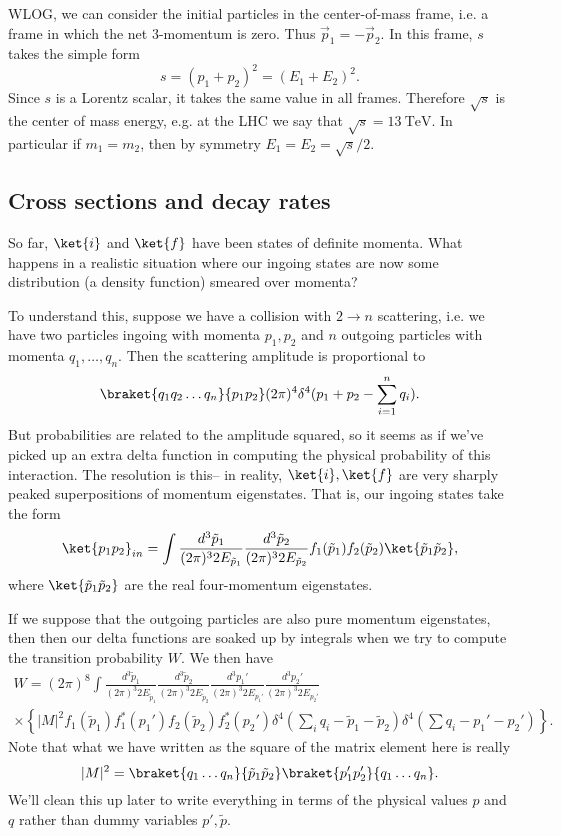 WLOG, we can consider the initial particles in the center-of-mass frame, i.e. a frame in which the net $3$-momentum is zero. Thus $\vec{p}_1=-\vec{p}_2.$
In this frame, $s$ takes the simple form
$$s=(p_1+p_2)^2=(E_1+E_2)^2.$$ Since $s$ is a Lorentz scalar, it takes the same value in all frames. Therefore $\sqrt{s}$ is the center of mass energy, e.g. at the LHC we say that $\sqrt{s}=\SI{13}{\tera\electronvolt}$. In particular if $m_1=m_2$, then by symmetry $E_1=E_2=\sqrt{s}/2.$

\subsection*{Cross sections and decay rates} So far, $\ket{i}$ and $\ket{f}$ have been states of definite momenta. What happens in a realistic situation where our ingoing states are now some distribution (a density function) smeared over momenta?

To understand this, suppose we have a collision with $2\to n$ scattering, i.e. we have two particles ingoing with momenta $p_1,p_2$ and $n$ outgoing particles with momenta $q_1,\ldots,q_n$. Then the scattering amplitude is proportional to
$$\braket{q_1 q_2\ldots q_n}{p_1p_2}(2\pi)^4 \delta^4(p_1+p_2 -\sum_{i=1}^n q_i).$$
But probabilities are related to the amplitude squared, so it seems as if we've picked up an extra delta function in computing the physical probability of this interaction. The resolution is this-- in reality, $\ket{i},\ket{f}$ are very sharply peaked superpositions of momentum eigenstates. That is, our ingoing states take the form
$$\ket{p_1p_2}_{in}=\int \frac{d^3 \tilde p_1}{(2\pi)^3 2E_{\tilde p_1}}\frac{d^3 \tilde p_2}{(2\pi)^3 2E_{\tilde p_2}} f_1(\tilde p_1)f_2 (\tilde p_2)\ket{\tilde p_1 \tilde p_2},$$
where $\ket{\tilde p_1 \tilde p_2}$ are the real four-momentum eigenstates.

If we suppose that the outgoing particles are also pure momentum eigenstates, then then our delta functions are soaked up by integrals when we try to compute the transition probability $W$. We then have
\begin{multline*}
    W = (2\pi)^8\int \frac{d^3 \tilde p_1}{(2\pi)^3 2E_{\tilde p_1}} 
        \frac{d^3 \tilde p_2}{(2\pi)^3 2E_{\tilde p_2}} \frac{d^3 p_1'}{(2\pi)^3 2E_{p_1'}} \frac{d^3 p_2'}{(2\pi)^3 2E_{p_2'}}\\ 
            \times\left\{|M|^2 f_1(\tilde p_1)f_1^* (p_1')f_2(\tilde p_2)f_2^*(p_2')\delta^4(\sum_i q_i -\tilde p_1 -\tilde p_2)\delta^4(\sum q_i-p_1' -p_2')\right\}.
\end{multline*}
Note that what we have written as the square of the matrix element here is really $$|M|^2=\braket{q_1\ldots q_n}{\tilde p_1 \tilde p_2}\braket{p_1'p_2'}{q_1\ldots q_n}.$$ We'll clean this up later to write everything in terms of the physical values $p$ and $q$ rather than dummy variables $p', \tilde p.$

